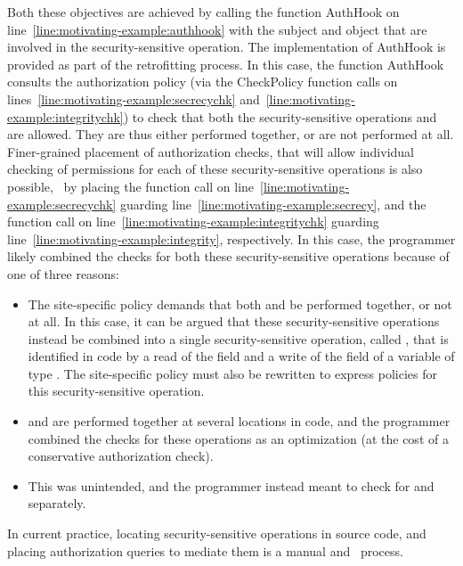 \begin{enumerate}
Both these objectives are achieved by calling the function \textsf{AuthHook} on
line~\ref{line:motivating-example:authhook} with the subject  and
object  that are involved in the security-sensitive operation. The
implementation of \textsf{AuthHook} is provided as part of the retrofitting
process.  In this case, the function \textsf{AuthHook} consults the
authorization policy (via the \textsf{CheckPolicy} function calls on
lines~\ref{line:motivating-example:secrecychk}
and~\ref{line:motivating-example:integritychk}) to check that both the
security-sensitive operations  and  are allowed.
They are thus either performed together, or are not performed at all.
Finer-grained placement of authorization checks, that will allow individual
checking of permissions for each of these security-sensitive operations is also
possible, \eg~by placing the function call on
line~\ref{line:motivating-example:secrecychk} guarding
line~\ref{line:motivating-example:secrecy}, and the function call on
line~\ref{line:motivating-example:integritychk} guarding
line~\ref{line:motivating-example:integrity}, respectively. In this case, the
programmer likely combined the checks for both these security-sensitive
operations because of one of three reasons:

\begin{itemize}
%
\item The site-specific policy demands that both  and
 be performed together, or not at all. In this case, it can be
argued that these security-sensitive operations instead be combined into a
single security-sensitive operation, called , that is
identified in code by a read of the  field and a write of the
 field of a variable of type . The
site-specific policy must also be rewritten to express policies for this
security-sensitive operation.
%
\item {} and  are performed together at several
locations in code, and the programmer combined the checks for these operations
as an optimization (at the cost of a conservative authorization check).
%
\item This was unintended, and the programmer instead meant to check for
 and  separately.
%
\end{itemize}

In current practice, locating security-sensitive operations in source code, and
placing authorization queries to mediate them is a manual and \adhoc\ process.



\end{enumerate}
